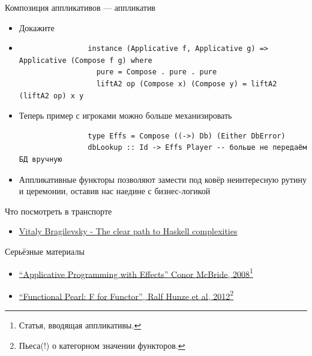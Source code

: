     \begin{frame}[fragile]{Композиция аппликативов --- аппликатив}
        \begin{itemize}
            \item[\todo] Докажите
            \item[\answer] \pause
            \begin{verbatim}
                instance (Applicative f, Applicative g) => Applicative (Compose f g) where
                  pure = Compose . pure . pure
                  liftA2 op (Compose x) (Compose y) = liftA2 (liftA2 op) x y
            \end{verbatim}
            \item Теперь пример с игроками можно больше механизировать
            \begin{verbatim}
                type Effs = Compose ((->) Db) (Either DbError)
                dbLookup :: Id -> Effs Player -- больше не передаём БД вручную
            \end{verbatim}
            \item[\NB] Аппликативные функторы позволяют замести под ковёр неинтересную рутину и церемонии, оставив нас наедине с бизнес-логикой
        \end{itemize}
    \end{frame}


    \begin{frame}[fragile]{Что посмотреть в транспорте}
        \begin{itemize}
            \item \href{https://youtu.be/n3H_YipBDrY?si=bsR5Fj56GEAIpAGE}{\color{blue} Vitaly Bragilevsky - The clear path to Haskell complexities}
        \end{itemize}
    \end{frame}

    \begin{frame}[fragile]{Серьёзные материалы}
        \begin{itemize}
            \item \href{https://www.staff.city.ac.uk/~ross/papers/Applicative.html}{\color{blue} ``Applicative Programming with Effects'' Conor McBride, 2008}\footnote{Статья, вводящая аппликативы.}
            \item \href{https://www.cs.ox.ac.uk/people/daniel.james/functor/functor.pdf}{\color{blue}``Functional Pearl: F for Functor'', Ralf Hunze et al, 2012}\footnote{Пьеса(!) о категорном значении функторов.}
        \end{itemize}
    \end{frame}


